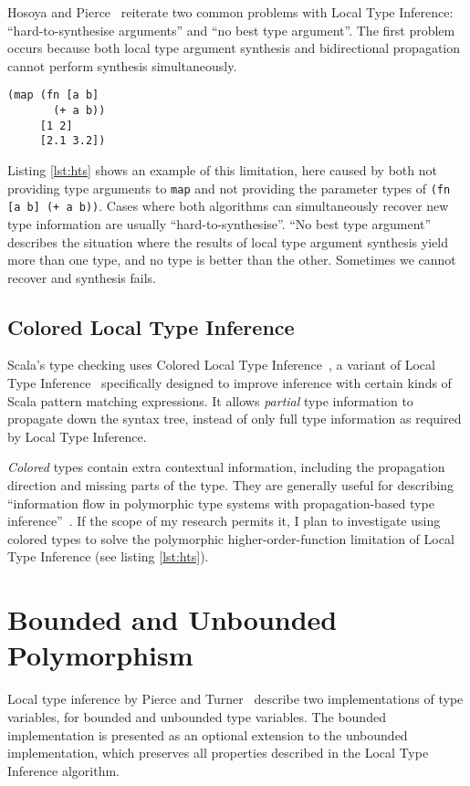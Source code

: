 Hosoya and Pierce~\cite{HP99} reiterate two common problems with Local Type Inference:
``hard-to-synthesise arguments'' and ``no best type argument''. The first problem occurs because
both local type argument synthesis and bidirectional propagation cannot perform synthesis
simultaneously. 

\begin{lstlisting}[caption=Hard-to-synthesise expression, label=lst:hts]
(map (fn [a b] 
       (+ a b)) 
     [1 2] 
     [2.1 3.2])
\end{lstlisting}

Listing \ref{lst:hts} shows an example of this limitation,
here caused by both not providing type arguments to \lstinline|map| and not providing the parameter types of \lstinline|(fn [a b] (+ a b))|.
 Cases where both algorithms can simultaneously recover new type information are usually ``hard-to-synthesise''.
``No best type argument'' describes the situation where the results of local
type argument synthesis yield more than one type, and no type is better than the other. Sometimes we cannot recover and synthesis
fails.

\subsection{Colored Local Type Inference}

Scala's type checking uses Colored Local Type Inference~\cite{OZZ01},
a variant of Local Type Inference~\cite{PT00} specifically designed to
improve inference with certain kinds of Scala pattern matching expressions. It allows
\emph{partial} type information to propagate down the syntax tree, instead of only full type information
as required by Local Type Inference.

\emph{Colored} types contain extra contextual information, including the propagation direction
and missing parts of the type. They are generally useful
for describing ``information flow in polymorphic type systems with propagation-based type inference''~\cite{OZZ01}. 
If the scope of my research permits it, I plan to investigate
using colored types to solve the polymorphic higher-order-function limitation of Local Type Inference
(see listing \ref{lst:hts}).

\section{Bounded and Unbounded Polymorphism}

Local type inference by Pierce and Turner~\cite{PT00}
describe two implementations of type variables, for bounded
and unbounded type variables. The bounded implementation is presented
as an optional extension  to the unbounded implementation, which preserves all
properties described in the Local Type Inference algorithm.

